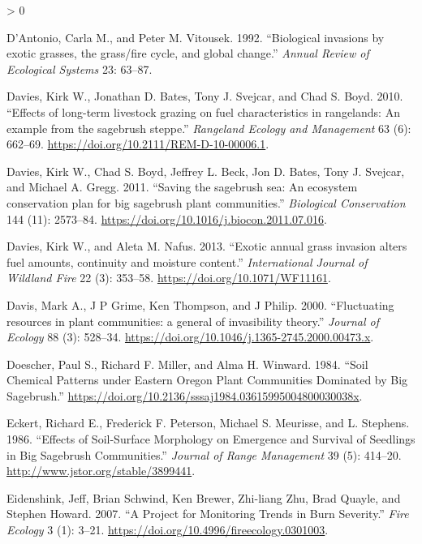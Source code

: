 \documentclass[
  12pt,
]{article}
\newlength{\cslhangindent}
\newenvironment{CSLReferences}[2] %
 {%
  \setlength{\parindent}{0pt}
  \ifodd #1 \everypar{\setlength{\hangindent}{\cslhangindent}}\ignorespaces\fi
  \ifnum #2 > 0
  \setlength{\parskip}{#2\baselineskip}
  \fi
 }%
 {}
\begin{document}
\begin{CSLReferences}{1}{0}
\leavevmode\hypertarget{ref-DAntonio1992}{}%
D'Antonio, Carla M., and Peter M. Vitousek. 1992. {``{Biological
invasions by exotic grasses, the grass/fire cycle, and global
change}.''} \emph{Annual Review of Ecological Systems} 23: 63--87.

\leavevmode\hypertarget{ref-Davies2010}{}%
Davies, Kirk W., Jonathan D. Bates, Tony J. Svejcar, and Chad S. Boyd.
2010. {``{Effects of long-term livestock grazing on fuel characteristics
in rangelands: An example from the sagebrush steppe}.''} \emph{Rangeland
Ecology and Management} 63 (6): 662--69.
\url{https://doi.org/10.2111/REM-D-10-00006.1}.

\leavevmode\hypertarget{ref-Davies2011}{}%
Davies, Kirk W., Chad S. Boyd, Jeffrey L. Beck, Jon D. Bates, Tony J.
Svejcar, and Michael A. Gregg. 2011. {``{Saving the sagebrush sea: An
ecosystem conservation plan for big sagebrush plant communities}.''}
\emph{Biological Conservation} 144 (11): 2573--84.
\url{https://doi.org/10.1016/j.biocon.2011.07.016}.

\leavevmode\hypertarget{ref-Davies2013}{}%
Davies, Kirk W., and Aleta M. Nafus. 2013. {``{Exotic annual grass
invasion alters fuel amounts, continuity and moisture content}.''}
\emph{International Journal of Wildland Fire} 22 (3): 353--58.
\url{https://doi.org/10.1071/WF11161}.

\leavevmode\hypertarget{ref-Davis2000}{}%
Davis, Mark A., J P Grime, Ken Thompson, and J Philip. 2000.
{``{Fluctuating resources in plant communities: a general of
invasibility theory}.''} \emph{Journal of Ecology} 88 (3): 528--34.
\url{https://doi.org/10.1046/j.1365-2745.2000.00473.x}.

\leavevmode\hypertarget{ref-Doescher1984}{}%
Doescher, Paul S., Richard F. Miller, and Alma H. Winward. 1984.
{``{Soil Chemical Patterns under Eastern Oregon Plant Communities
Dominated by Big Sagebrush}.''}
\url{https://doi.org/10.2136/sssaj1984.03615995004800030038x}.

\leavevmode\hypertarget{ref-Eckert1986}{}%
Eckert, Richard E., Frederick F. Peterson, Michael S. Meurisse, and L.
Stephens. 1986. {``{Effects of Soil-Surface Morphology on Emergence and
Survival of Seedlings in Big Sagebrush Communities}.''} \emph{Journal of
Range Management} 39 (5): 414--20.
\url{http://www.jstor.org/stable/3899441}.

\leavevmode\hypertarget{ref-Eidenshink2007}{}%
Eidenshink, Jeff, Brian Schwind, Ken Brewer, Zhi-liang Zhu, Brad Quayle,
and Stephen Howard. 2007. {``{A Project for Monitoring Trends in Burn
Severity}.''} \emph{Fire Ecology} 3 (1): 3--21.
\url{https://doi.org/10.4996/fireecology.0301003}.


\end{CSLReferences}
\end{document}
